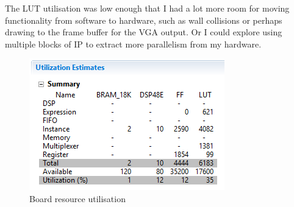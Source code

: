 \documentclass[12pt]{article} %
\begin{document}
The LUT utilisation was low enough that I had a lot more room for moving functionality from software to hardware, such as wall collisions or perhaps drawing to the frame buffer for the VGA output. Or I could explore using multiple blocks of IP to extract more parallelism from my hardware. 

\begin{figure}[h!]
  \centering
  \includegraphics[width=\linewidth]{figures/utilisation.jpg}
  \caption{Board resource utilisation}
  \label{Figure:utilisation}
\end{figure}

\printbibliography 
\end{document}
